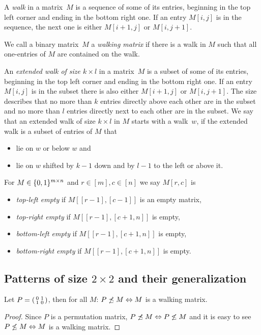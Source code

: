\begin{defn}
A \emph{walk} in a matrix~$M$ is a sequence of some of its entries, beginning in the top left corner and ending in the bottom right one. If an entry $M[i,j]$ is in the sequence, the next one is either $M[i+1,j]$ or $M[i,j+1]$.
\end{defn}
\begin{defn}
We call a binary matrix~$M$ a \emph{walking matrix} if there is a walk in $M$ such that all one-entries of $M$ are contained on the walk.
\end{defn}
\begin{defn}
An \emph{extended walk of size $k\times l$} in a matrix~$M$ is a subset of some of its entries, beginning in the top left corner and ending in the bottom right one. If an entry $M[i,j]$ is in the subset there is also either $M[i+1,j]$ or $M[i,j+1]$. The size describes that no more than $k$ entries directly above each other are in the subset and no more than $l$ entries directly next to each other are in the subset. We say that an extended walk of size $k\times l$ in $M$ starts with a walk~$w$, if the extended walk is a subset of entries of $M$ that
\begin{itemize}
\item lie on $w$ or below $w$ and
\item lie on $w$ shifted by $k-1$ down and by $l-1$ to the left or above it.
\end{itemize}
\end{defn}
\begin{defn}
For $M\in\{0,1\}^{m\times n}$ and $r\in[m],c\in[n]$ we say $M[r,c]$ is
\begin{itemize}
\item \emph{top-left empty} if $M[[r-1],[c-1]]$ is an empty matrix,
\item \emph{top-right empty} if $M[[r-1],[c+1,n]]$ is empty,
\item \emph{bottom-left empty} if $M[[r-1],[c+1,n]]$ is empty,
\item \emph{bottom-right empty} if $M[[r-1],[c+1,n]]$ is empty.
\end{itemize}
\end{defn}
\subsection{Patterns of size $2\times2$ and their generalization}
\begin{thm}
Let $P=\left(\begin{smallmatrix}0&1\\1&0\end{smallmatrix}\right)$, then for all $M$: $P\not\preceq M\Leftrightarrow M$ is a walking matrix.
\end{thm}
\begin{proof}
Since $P$ is a permutation matrix, $P\not\preceq M\Leftrightarrow P\not\leq M$ and it is easy to see $P\not\leq M\Leftrightarrow M$ is a walking matrix.
\end{proof}

